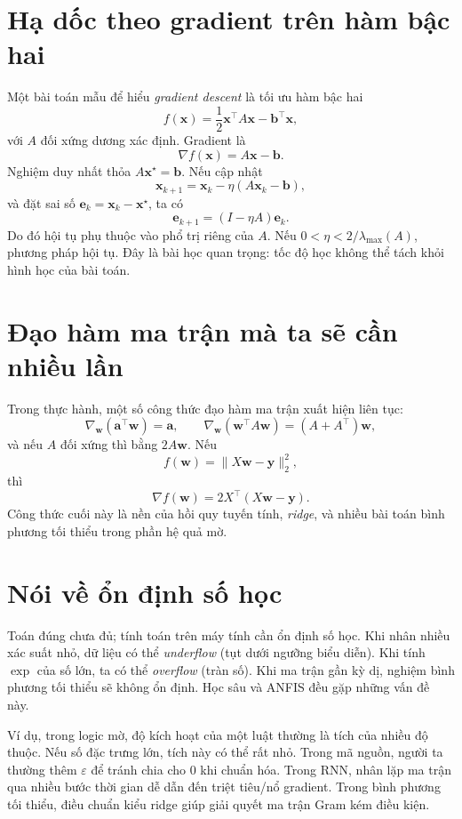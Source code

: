 \section{Hạ dốc theo gradient trên hàm bậc hai}

Một bài toán mẫu để hiểu \emph{gradient descent} là tối ưu hàm bậc hai
\[
f(\bm{x})=\frac{1}{2}\bm{x}^\top A\bm{x}-\bm{b}^\top \bm{x},
\]
với $A$ đối xứng dương xác định. Gradient là
\[
\nabla f(\bm{x})=A\bm{x}-\bm{b}.
\]
Nghiệm duy nhất thỏa $A\bm{x}^\star=\bm{b}$. Nếu cập nhật
\[
\bm{x}_{k+1}=\bm{x}_k-\eta(A\bm{x}_k-\bm{b}),
\]
và đặt sai số $\bm{e}_k=\bm{x}_k-\bm{x}^\star$, ta có
\[
\bm{e}_{k+1}=(I-\eta A)\bm{e}_k.
\]
Do đó hội tụ phụ thuộc vào phổ trị riêng của $A$. Nếu \(0<\eta<2/\lambda_{\max}(A)\), phương pháp hội tụ. Đây là bài học quan trọng: tốc độ học không thể tách khỏi hình học của bài toán.

\section{Đạo hàm ma trận mà ta sẽ cần nhiều lần}

Trong thực hành, một số công thức đạo hàm ma trận xuất hiện liên tục:
\[
\nabla_{\bm{w}} (\bm{a}^\top \bm{w}) = \bm{a},
\qquad
\nabla_{\bm{w}} (\bm{w}^\top A \bm{w}) = (A+A^\top)\bm{w},
\]
và nếu $A$ đối xứng thì bằng $2A\bm{w}$. Nếu
\[
f(\bm{w}) = \|X\bm{w}-\bm{y}\|_2^2,
\]
thì
\[
\nabla f(\bm{w}) = 2X^\top(X\bm{w}-\bm{y}).
\]
Công thức cuối này là nền của hồi quy tuyến tính, \emph{ridge}, và nhiều bài toán bình phương tối thiểu trong phần hệ quả mờ.

\section{Nói về ổn định số học}

Toán đúng chưa đủ; tính toán trên máy tính cần ổn định số học. Khi nhân nhiều xác suất nhỏ, dữ liệu có thể \emph{underflow} (tụt dưới ngưỡng biểu diễn). Khi tính \(\exp\) của số lớn, ta có thể \emph{overflow} (tràn số). Khi ma trận gần kỳ dị, nghiệm bình phương tối thiểu sẽ không ổn định. Học sâu và ANFIS đều gặp những vấn đề này.

Ví dụ, trong logic mờ, độ kích hoạt của một luật thường là tích của nhiều độ thuộc. Nếu số đặc trưng lớn, tích này có thể rất nhỏ. Trong mã nguồn, người ta thường thêm \(\varepsilon\) để tránh chia cho 0 khi chuẩn hóa. Trong RNN, nhân lặp ma trận qua nhiều bước thời gian dễ dẫn đến triệt tiêu/nổ gradient. Trong bình phương tối thiểu, điều chuẩn kiểu ridge giúp giải quyết ma trận Gram kém điều kiện.

